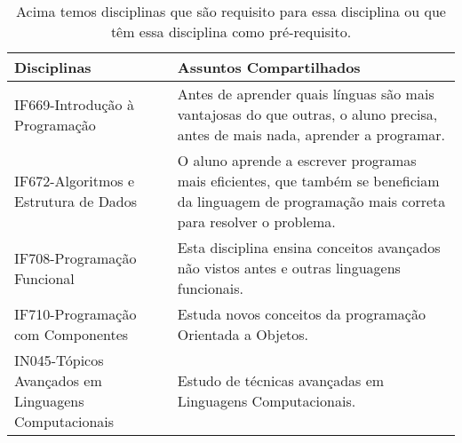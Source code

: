 \documentclass[10pt, a4paper]{article}
\begin{document}
\begin{table}[H]
\centering
\begin{tabular}{|p{3.2cm}|p{7.8cm}|}
\hline
 Disciplinas & Assuntos Compartilhados \\ \hline
 IF669-Introdução à Programação & Antes de aprender quais línguas são mais vantajosas do que outras, o aluno precisa, antes de mais nada, aprender a programar.\\ \hline
 IF672-Algoritmos e Estrutura de Dados & O aluno aprende a escrever programas mais eficientes, que também se beneficiam da linguagem de programação mais correta para resolver o problema.\\ \hline
 IF708-Programação Funcional & Esta disciplina ensina conceitos avançados não vistos antes e outras linguagens funcionais.\\ \hline
 IF710-Programação com Componentes & Estuda novos conceitos da programação Orientada a Objetos.\\ \hline
 IN045-Tópicos Avançados em Linguagens Computacionais &  Estudo de técnicas avançadas em Linguagens Computacionais.\\
 \hline
\end{tabular}
\caption{Acima temos disciplinas que são requisito para essa disciplina ou que têm essa disciplina como pré-requisito.}
\label{tab:disciplinaeassuntoscompartilhados}
\end{table}



\end{document}
